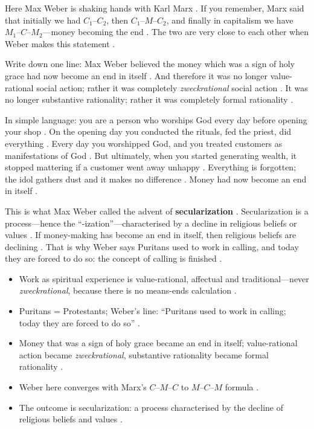 \begin{ComparisonBox}
Here Max Weber is shaking hands with Karl Marx . If you remember, Marx said that initially we had $C_1\text{--}C_2$, then $C_1\text{--}M\text{--}C_2$, and finally in capitalism we have $M_1\text{--}C\text{--}M_2$---money becoming the end .
The two are very close to each other when Weber makes this statement .
\end{ComparisonBox}

\begin{KeyConcept}
Write down one line: Max Weber believed the money which was a sign of holy grace had now become an end in itself .
And therefore it was no longer value-rational social action; rather it was completely \textit{zweckrational} social action .
It was no longer substantive rationality; rather it was completely formal rationality .
\end{KeyConcept}

\begin{ExampleBox}
In simple language: you are a person who worships God every day before opening your shop . On the opening day you conducted the rituals, fed the priest, did everything . Every day you worshipped God, and you treated customers as manifestations of God .
But ultimately, when you started generating wealth, it stopped mattering if a customer went away unhappy . Everything is forgotten; the idol gathers dust and it makes no difference . Money had now become an end in itself .
\end{ExampleBox}

\begin{KeyConcept}
This is what Max Weber called the advent of \textbf{secularization} .
Secularization is a process---hence the ``-ization''---characterised by a decline in religious beliefs or values .
If money-making has become an end in itself, then religious beliefs are declining . That is why Weber says Puritans used to work in calling, and today they are forced to do so: the concept of calling is finished .
\end{KeyConcept}

\begin{QuickRevision}
\begin{itemize}
    \item Work as spiritual experience is value-rational, affectual and traditional---never \textit{zweckrational}, because there is no means-ends calculation .
    \item Puritans = Protestants; Weber's line: ``Puritans used to work in calling; today they are forced to do so'' .
    \item Money that was a sign of holy grace became an end in itself; value-rational action became \textit{zweckrational}, substantive rationality became formal rationality .
    \item Weber here converges with Marx's $C\text{--}M\text{--}C$ to $M\text{--}C\text{--}M$ formula .
    \item The outcome is secularization: a process characterised by the decline of religious beliefs and values .
\end{itemize}
\end{QuickRevision}

